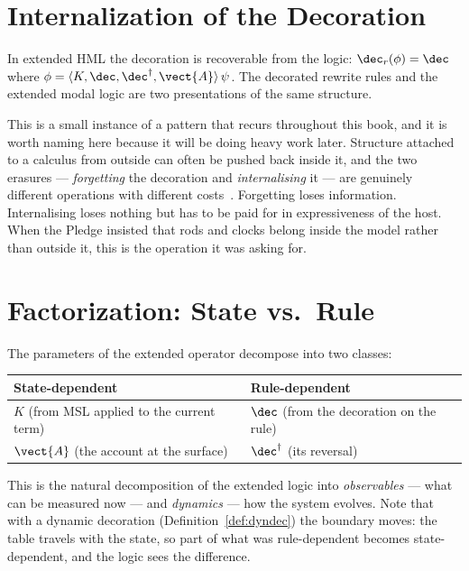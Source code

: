 \section{Internalization of the Decoration}

\begin{proposition}
In extended HML the decoration is recoverable from the logic:
$\dec_r(\phi) = \dec$ where
$\phi = \langle K, \dec, \dec^{\dagger}, \vect{A}\rangle\,\psi$.  The
decorated rewrite rules and the extended modal logic are two presentations
of the same structure.
\end{proposition}

This is a small instance of a pattern that recurs throughout this book,
and it is worth naming here because it will be doing heavy work later.
Structure attached to a calculus from outside can often be pushed back
inside it, and the two erasures --- \emph{forgetting} the decoration and
\emph{internalising} it --- are genuinely different operations with
different costs~\cite{TwoErasures}.  Forgetting loses information.
Internalising loses nothing but has to be paid for in expressiveness of
the host.  When the Pledge insisted that rods and clocks belong inside the
model rather than outside it, this is the operation it was asking for.

\section{Factorization: State vs.\ Rule}

The parameters of the extended operator decompose into two classes:

\begin{center}
\begin{tabular}{ll}
\toprule
\textbf{State-dependent} & \textbf{Rule-dependent} \\
\midrule
$K$ (from MSL applied to the current term) & $\dec$ (from the decoration on the rule) \\
$\vect{A}$ (the account at the surface) & $\dec^{\dagger}$ (its reversal) \\
\bottomrule
\end{tabular}
\end{center}

This is the natural decomposition of the extended logic into
\emph{observables} --- what can be measured now --- and \emph{dynamics} ---
how the system evolves.  Note that with a dynamic decoration
(Definition~\ref{def:dyndec}) the boundary moves: the table travels with
the state, so part of what was rule-dependent becomes state-dependent, and
the logic sees the difference.

